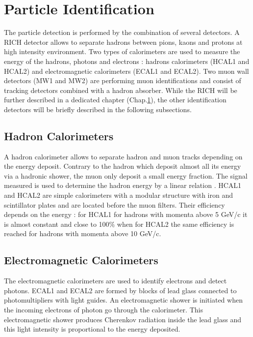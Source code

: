 
\section{Particle Identification}

The particle detection is performed by the combination of several detectors. A RICH detector allows to separate hadrons between pions, kaons and protons
at high intensity environment. Two types of calorimeters are used to measure the energy of the hadrons, photons and electrons : hadrons calorimeters
(HCAL1 and HCAL2) and electromagnetic calorimeters (ECAL1 and ECAL2). Two muon wall detectors (MW1 and MW2) are performing muon identifications and
consist of tracking detectors combined with a hadron absorber. While the RICH will be further described in a dedicated chapter (Chap.\ref{}), the other
identification detectors will be briefly described in the following subsections.

\subsection*{Hadron Calorimeters}

A hadron calorimeter allows to separate hadron and muon tracks depending on the energy deposit. Contrary to the hadron which deposit almost all its energy
via a hadronic shower, the muon only deposit a small energy fraction. The signal measured is used to determine the hadron energy by a linear relation \cite{}.
HCAL1 and HCAL2 are simple calorimeters with a modular structure with iron and scintillator plates and are located before the muon filters. Their efficiency
depends on the energy : for HCAL1 for hadrons with momenta above 5 GeV/c it is almost constant and close to 100\% when for HCAL2 the same efficiency is reached
for hadrons with momenta above 10 GeV/c.

\subsection*{Electromagnetic Calorimeters}

The electromagnetic calorimeters are used to identify electrons and detect photons. ECAL1 and ECAL2 are formed by blocks of lead glass connected to photomultipliers
with light guides. An electromagnetic shower is initiated when the incoming electrons of photon go through the calorimeter. This electromagnetic shower produces
Cherenkov radiation inside the lead glass and this light intensity is proportional to the energy deposited.

